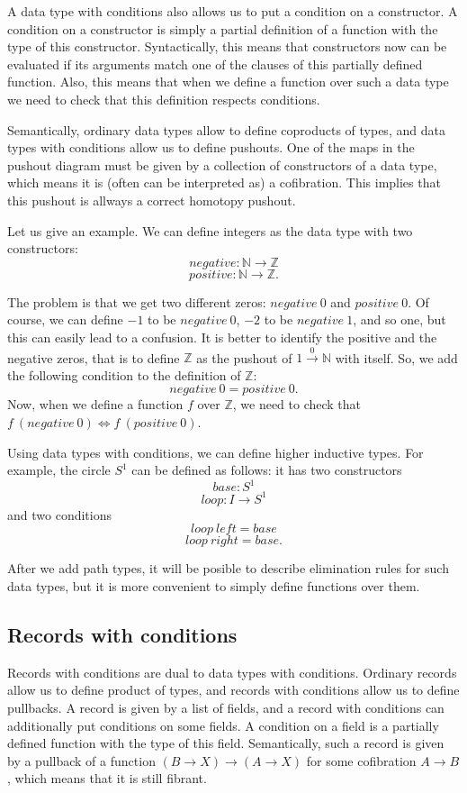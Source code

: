 \documentclass{amsart}
\theoremstyle{definition}
\theoremstyle{remark}
\newcommand{\deq}{\Leftrightarrow}
\numberwithin{figure}{section}
\begin{document}
A data type with conditions also allows us to put a condition on a constructor.
A condition on a constructor is simply a partial definition of a function with the type of this constructor.
Syntactically, this means that constructors now can be evaluated if its arguments match one of the clauses of this partially defined function.
Also, this means that when we define a function over such a data type we need to check that this definition respects conditions.

Semantically, ordinary data types allow to define coproducts of types, and data types with conditions allow us to define pushouts.
One of the maps in the pushout diagram must be given by a collection of constructors of a data type, which means it is (often can be interpreted as) a cofibration.
This implies that this pushout is allways a correct homotopy pushout.

Let us give an example. We can define integers as the data type with two constructors:
\[ negative : \mathbb{N} \to \mathbb{Z} \]
\[ positive : \mathbb{N} \to \mathbb{Z}. \]

The problem is that we get two different zeros: $negative\ 0$ and $positive\ 0$.
Of course, we can define $-1$ to be $negative\ 0$, $-2$ to be $negative\ 1$, and so one, but this can easily lead to a confusion.
It is better to identify the positive and the negative zeros, that is to define $\mathbb{Z}$ as the pushout of $1 \overset{0}\to \mathbb{N}$ with itself.
So, we add the following condition to the definition of $\mathbb{Z}$:
\[ negative\ 0 = positive\ 0. \]
Now, when we define a function $f$ over $\mathbb{Z}$, we need to check that $f\ (negative\ 0) \deq f\ (positive\ 0)$.

Using data types with conditions, we can define higher inductive types.
For example, the circle $S^1$ can be defined as follows: it has two constructors
\[ base : S^1 \]
\[ loop : I \to S^1 \]
and two conditions
\[ loop\ left = base \]
\[ loop\ right = base. \]

After we add path types, it will be posible to describe elimination rules for such data types,
but it is more convenient to simply define functions over them.

\subsection{Records with conditions}

Records with conditions are dual to data types with conditions.
Ordinary records allow us to define product of types, and records with conditions allow us to define pullbacks.
A record is given by a list of fields, and a record with conditions can additionally put conditions on some fields.
A condition on a field is a partially defined function with the type of this field.
Semantically, such a record is given by a pullback of a function $(B \to X) \to (A \to X)$ for some cofibration $A \to B$, which means that it is still fibrant.
\end{document}
